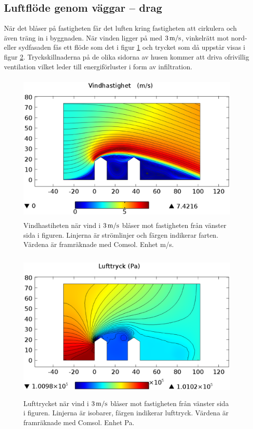 \subsection{Luftflöde genom väggar – drag}

När det blåser på fastigheten får det luften kring fastigheten att cirkulera och även träng in i 
byggnaden. När vinden ligger på med $\unit[3]{m/s}$, vinkelrätt mot nord- eller sydfasaden fås 
ett flöde som det i figur \ref{fig:windspeed} och trycket som då uppstår visas i figur 
\ref{fig:windpressure}. Tryckskillnaderna på de olika sidorna av husen kommer att driva 
ofrivillig ventilation vilket leder till energiförluster i form av infiltration.

\begin{figure}[hpbt]
\centering
\includegraphics[width=127mm,height=76mm]{images/wind3mshdpi.eps}
\caption{\label{fig:windspeed}Vindhastiheten när vind i $\unit[3]{m/s}$ blåser mot fastigheten 
från vänster sida i figuren. Linjerna är strömlinjer och färgen indikerar farten. Värdena är 
framräknade med Comsol. Enhet m/s.}
\end{figure}


\begin{figure}[hpbt]
\centering
\includegraphics[width=127mm,height=76mm]{images/pressure3mshdpi.eps}

\caption{\label{fig:windpressure}Lufttrycket när vind i $\unit[3]{m/s}$ blåser mot fastigheten från vänster sida i figuren. Linjerna är isobarer, färgen indikerar lufttryck. Värdena är framräknade med Comsol. Enhet Pa.}
\end{figure}

